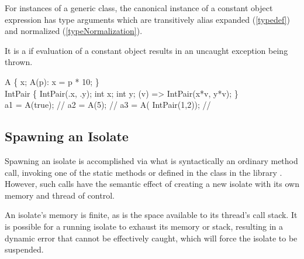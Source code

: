 \documentclass[makeidx]{article}
\begin{document}
{\LMHash{}%
For instances of a generic class,
the canonical instance of a constant object expression has type arguments
which are transitively alias expanded
(\ref{typedef})
and normalized
(\ref{typeNormalization}).

\LMHash{}%
It is a  if evaluation of a constant object
results in an uncaught exception being thrown.


\begin{dartCode}
\CLASS{} A \{
  \FINAL{} x;
  \CONST{} A(p): x = p * 10;
\}
\\
\CLASS{} IntPair \{
  \CONST{} IntPair(\THIS.x, \THIS.y);
  \FINAL{} int x;
  \FINAL{} int y;
  \OPERATOR *(v) => \NEW{} IntPair(x*v, y*v);
\}
\\
\CONST a1 = \CONST{} A(true); // 
\CONST a2 = \CONST{} A(5); // 
\CONST a3 = \CONST{} A(\CONST{} IntPair(1,2)); // 
\end{dartCode}



\subsection{Spawning an Isolate}

\LMHash{}%
Spawning an isolate is accomplished via what is syntactically
an ordinary method call,
invoking one of the static methods  or  defined in
the  class in the library .
However, such calls have the semantic effect of creating
a new isolate with its own memory and thread of control.

\LMHash{}%
An isolate's memory is finite, as is the space available to
its thread's call stack.
It is possible for a running isolate to exhaust its memory or stack,
resulting in a dynamic error that cannot be effectively caught,
which will force the isolate to be suspended.

}
\end{document}
